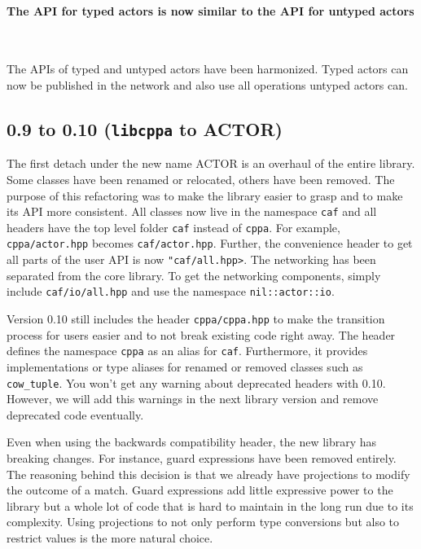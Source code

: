 \paragraph{The API for typed actors is now similar to the API for untyped actors}

~

The APIs of typed and untyped actors have been harmonized. Typed actors can now
be published in the network and also use all operations untyped actors can.

\clearpage
\subsection{0.9 to 0.10 (\texttt{libcppa} to ACTOR)}

The first detach under the new name ACTOR is an overhaul of the entire library.
Some classes have been renamed or relocated, others have been removed. The
purpose of this refactoring was to make the library easier to grasp and to make
its API more consistent. All classes now live in the namespace \texttt{caf} and
all headers have the top level folder \texttt{caf} instead of \texttt{cppa}.
For example, \texttt{cppa/actor.hpp} becomes \texttt{caf/actor.hpp}. Further,
the convenience header to get all parts of the user API is now
\texttt{"caf/all.hpp>}. The networking has been separated from the core
library. To get the networking components, simply include
\texttt{caf/io/all.hpp} and use the namespace \lstinline^nil::actor::io^.

Version 0.10 still includes the header \texttt{cppa/cppa.hpp} to make the
transition process for users easier and to not break existing code right away.
The header defines the namespace \texttt{cppa} as an alias for \texttt{caf}.
Furthermore, it provides implementations or type aliases for renamed or removed
classes such as \lstinline^cow_tuple^. You won't get any warning about deprecated
headers with 0.10. However, we will add this warnings in the next library
version and remove deprecated code eventually.

Even when using the backwards compatibility header, the new library has
breaking changes. For instance, guard expressions have been removed entirely.
The reasoning behind this decision is that we already have projections to
modify the outcome of a match. Guard expressions add little expressive power to
the library but a whole lot of code that is hard to maintain in the long run
due to its complexity. Using projections to not only perform type conversions
but also to restrict values is the more natural choice.

